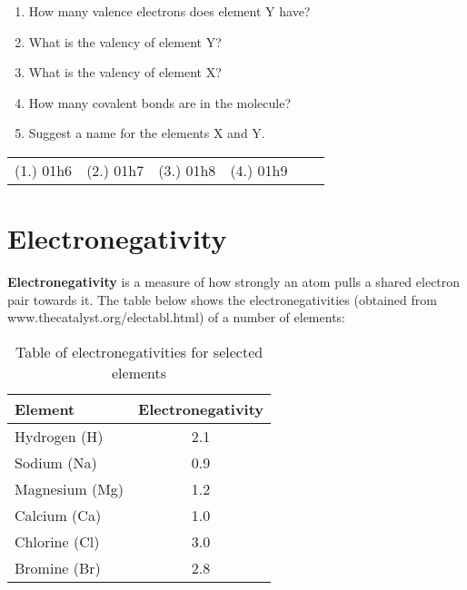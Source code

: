 {\begin{enumerate}
{\begin{enumerate}
\item{How many valence electrons does element Y have?}
\item{What is the valency of element Y?}
\item{What is the valency of element X?}
\item{How many covalent bonds are in the molecule?}
\item{Suggest a name for the elements X and Y.}
\end{enumerate}
}

\end{enumerate}
\practiceinfo

\begin{tabular}[h]{cccccc}
(1.) 01h6 & (2.) 01h7 & (3.) 01h8 & (4.) 01h9 &   & 
 \end{tabular}
}







\section{Electronegativity}

\textbf{Electronegativity} is a measure of how strongly an atom pulls a shared electron pair towards it. The table below shows the electronegativities (obtained from www.thecatalyst.org/electabl.html) of a number of elements:

\begin{table}[!h]
\begin{center}
\begin{tabular}{|l|c|}\hline
\textbf{Element} & \textbf{Electronegativity}\\\hline
Hydrogen (H) & 2.1\\\hline
Sodium (Na) & 0.9\\\hline
Magnesium (Mg) & 1.2\\\hline
Calcium (Ca) & 1.0\\\hline
Chlorine (Cl) & 3.0\\\hline
Bromine (Br) & 2.8\\\hline
\end{tabular}
\caption{Table of electronegativities for selected elements}
\end{center}
\end{table}
\vspace{-1cm}

